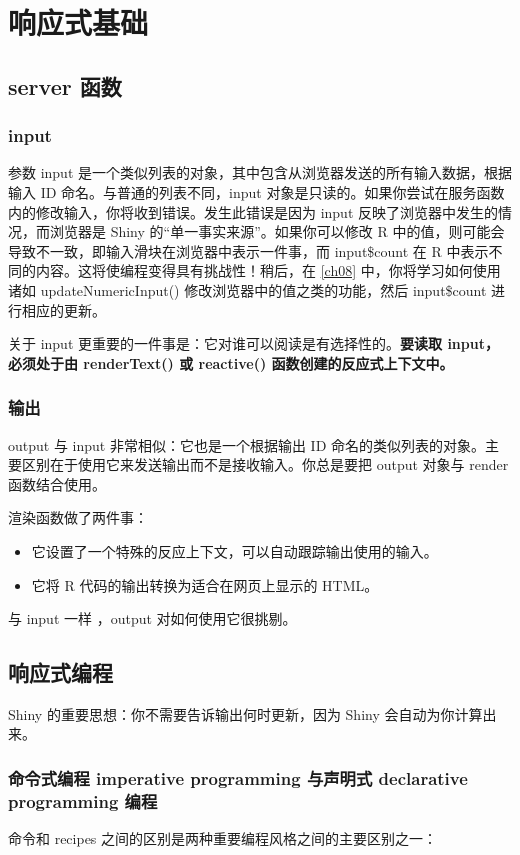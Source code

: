 \chapter{响应式基础\label{ch03}}
\section{server 函数}
\subsection{input}
参数 input 是一个类似列表的对象，其中包含从浏览器发送的所有输入数据，根据输入 ID 命名。与普通的列表不同，input 对象是只读的。如果你尝试在服务函数内的修改输入，你将收到错误。发生此错误是因为 input 反映了浏览器中发生的情况，而浏览器是 Shiny 的“单一事实来源”。如果你可以修改 R 中的值，则可能会导致不一致，即输入滑块在浏览器中表示一件事，而 input\$count 在 R 中表示不同的内容。这将使编程变得具有挑战性！稍后，在 \autoref{ch08} 中，你将学习如何使用诸如 updateNumericInput() 修改浏览器中的值之类的功能，然后 input\$count 进行相应的更新。

关于 input 更重要的一件事是：它对谁可以阅读是有选择性的。\textbf{要读取 input，必须处于由 renderText() 或 reactive() 函数创建的反应式上下文中。}
\subsection{输出}
output 与 input 非常相似：它也是一个根据输出 ID 命名的类似列表的对象。主要区别在于使用它来发送输出而不是接收输入。你总是要把 output 对象与 render 函数结合使用。

渲染函数做了两件事：
\begin{itemize}
    \item 它设置了一个特殊的反应上下文，可以自动跟踪输出使用的输入。

    \item 它将 R 代码的输出转换为适合在网页上显示的 HTML。
\end{itemize}
与 input 一样 ，output 对如何使用它很挑剔。
\section{响应式编程}
Shiny 的重要思想：你不需要告诉输出何时更新，因为 Shiny 会自动为你计算出来。
\subsection{命令式编程 imperative programming 与声明式 declarative programming 编程}
命令和  recipes 之间的区别是两种重要编程风格之间的主要区别之一：


